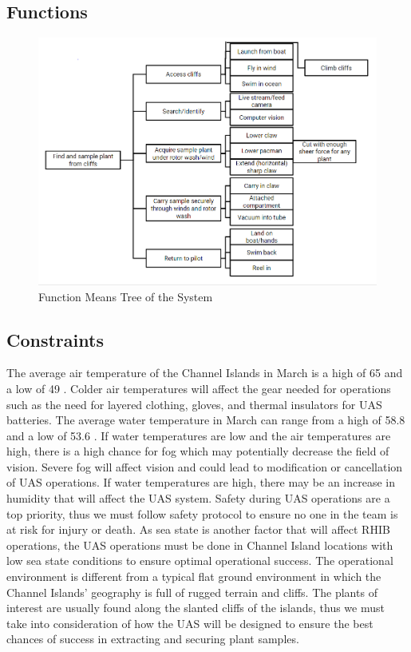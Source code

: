 \documentclass{wrcecapstone}
\begin{document}
\subsection{Functions}
\begin{figure}
\begin{center}
\includegraphics[width=\columnwidth]{figures/fig5-function-tree.png}
\end{center}
\caption{Function Means Tree of the System}
\label{fig:2.2.1}
\end{figure}

\subsection{Constraints}
The average air temperature of the Channel Islands in March is a high of \SI{65}{\fahrenheit} and a low of \SI{49}{\fahrenheit} \cite{accuweather2019channel}. Colder air temperatures will affect the gear needed for operations such as the need for layered clothing, gloves, and thermal insulators for UAS batteries. The average water temperature in March can range from a high of \SI{58.8}{\fahrenheit} and a low of \SI{53.6}{\fahrenheit} \cite{nps2019weather}. If water temperatures are low and the air temperatures are high, there is a high chance for fog which may potentially decrease the field of vision. Severe fog will affect vision and could lead to modification or cancellation of UAS operations. If water temperatures are high, there may be an increase in humidity that will affect the UAS system. Safety during UAS operations are a top priority, thus we must follow safety protocol to ensure no one in the team is at risk for injury or death. As sea state is another factor that will affect RHIB operations, the UAS operations must be done in Channel Island locations with low sea state conditions to ensure optimal operational success. The operational environment is different from a typical flat ground environment in which the Channel Islands’ geography is full of rugged terrain and cliffs. The plants of interest are usually found along the slanted cliffs of the islands, thus we must take into consideration of how the UAS will be designed to ensure the best chances of success in extracting and securing plant samples. 
\end{document}
